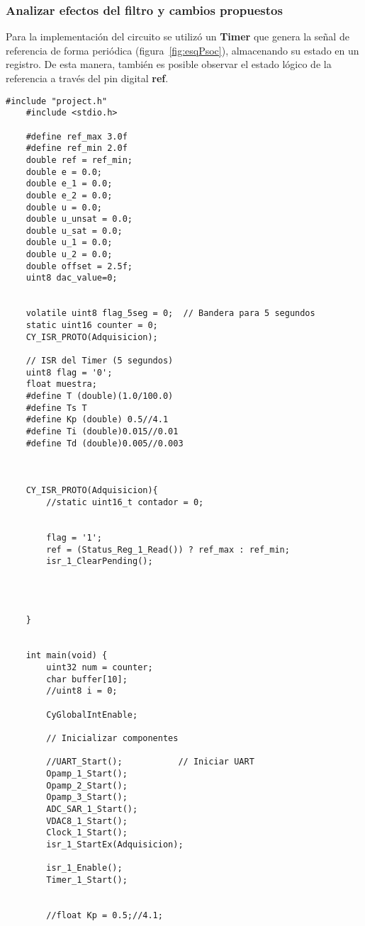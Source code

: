 \subsubsection{Analizar efectos del filtro y cambios propuestos}
Para la implementación del circuito se utilizó un \textbf{Timer} que genera la señal de referencia de forma periódica (figura~\ref{fig:esqPsoc}), almacenando su estado en un registro. De esta manera, también es posible observar el estado lógico de la referencia a través del pin digital \textbf{ref}.



\begin{lstlisting}[style=cstyle,caption={Ejemplo en C},label={lst:c}]
	#include "project.h"
	#include <stdio.h>
	
	#define ref_max 3.0f
	#define ref_min 2.0f
	double ref = ref_min;
	double e = 0.0;
	double e_1 = 0.0;
	double e_2 = 0.0;
	double u = 0.0;
	double u_unsat = 0.0;
	double u_sat = 0.0;
	double u_1 = 0.0;
	double u_2 = 0.0;
	double offset = 2.5f; 
	uint8 dac_value=0;
	
	
	volatile uint8 flag_5seg = 0;  // Bandera para 5 segundos
	static uint16 counter = 0;
	CY_ISR_PROTO(Adquisicion);
	
	// ISR del Timer (5 segundos)
	uint8 flag = '0';
	float muestra;
	#define T (double)(1.0/100.0)
	#define Ts T
	#define Kp (double) 0.5//4.1
	#define Ti (double)0.015//0.01
	#define Td (double)0.005//0.003
	
	
	
	CY_ISR_PROTO(Adquisicion){
		//static uint16_t contador = 0;
		
		
		flag = '1';
		ref = (Status_Reg_1_Read()) ? ref_max : ref_min;
		isr_1_ClearPending();
		
		
		
		
	}
	
	
	int main(void) {
		uint32 num = counter;
		char buffer[10];
		//uint8 i = 0;
		
		CyGlobalIntEnable;
		
		// Inicializar componentes
		
		//UART_Start();           // Iniciar UART
		Opamp_1_Start();
		Opamp_2_Start();
		Opamp_3_Start();
		ADC_SAR_1_Start();
		VDAC8_1_Start();
		Clock_1_Start();
		isr_1_StartEx(Adquisicion);
		
		isr_1_Enable();
		Timer_1_Start();
		
		
		//float Kp = 0.5;//4.1;
		

\end{lstlisting}
